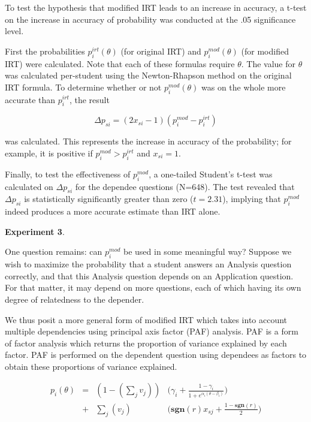 \documentclass[a4paper,twocolumn]{article}
\begin{document}
To test the hypothesis that modified IRT leads to an increase in accuracy,
a t-test on the increase in accuracy of probability was conducted at the
.05 significance level.

First the probabilities $p_i^{irt}(\theta)$ (for original IRT) and
$p_i^{mod}(\theta)$ (for modified IRT) were calculated.  Note that each of
these formulas require $\theta$. The value for $\theta$ was calculated
per-student using the Newton-Rhapson method on the original IRT formula.  To
determine whether or not $p_i^{mod}(\theta)$ was on the whole more accurate
than $p_i^{irt}$, the result

\[
  \Delta p_{si} = (2x_{si}-1) (p_i^{mod} - p_i^{irt})
\]

was calculated. This represents the increase in accuracy of the probability;
for example, it is positive if $p_i^{mod} > p_i^{irt}$ and $x_{si} = 1$.

Finally, to test the effectiveness of $p_i^{mod}$, a one-tailed Student's
t-test was calculated on $\Delta p_{si}$ for the dependee questions (N=648).
The test revealed that $\Delta p_{si}$ is statistically significantly greater
than zero ($t=2.31$), implying that $p_i^{mod}$ indeed produces a more accurate
estimate than IRT alone. 


\textbf{Experiment 3}. 

One question remains: can $p_i^{mod}$ be used in some meaningful way?  Suppose
we wish to maximize the probability that a student answers an Analysis question
correctly, and that this Analysis question depends on an Application question.  
For that matter, it may depend on more questions, each of which having its own
degree of relatedness to the depender.

We thus posit a more general form of modified IRT which takes into account
multiple dependencies using principal axis factor (PAF) analysis.  PAF is a
form of factor analysis which returns the proportion of variance explained by
each factor.  PAF is performed on the dependent question using dependees as
factors to obtain these proportions of variance explained.

\begin{align*}
  p_i(\theta) &=& (1- (\displaystyle\sum_j v_j)) & \Big(\gamma_i + \frac{1-\gamma_i}{1+e^{\alpha_i(\theta-\beta_i)}}\Big) \\
              &+& \displaystyle\sum_j (v_j)   & \Big(\mathbf{sgn}(r)x_{sj}+\frac{1-\mathbf{sgn}(r)}{2}\Big)
\end{align*}
\end{document}
